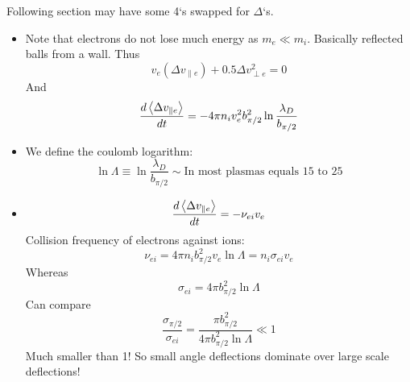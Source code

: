 Following section may have some 4`s swapped for $\Delta$`s. 
\begin{itemize}
\item Note that electrons do not lose much energy as $m_e \ll m_i$. Basically reflected balls from a wall. Thus
\[ v_e (\Delta v_{\parallel e}) + 0.5 \Delta v_{\perp e}^2 = 0\]
And
\[\frac{d \left< \Delta v_{\parallel e} \right>}{d t} = - 4 \pi n_i v_e^2 b_{\pi/2}^2 \ln{\frac{\lambda_D}{b_{\pi/2}}} \]
\item We define the coulomb logarithm: 
\[ \ln{\Lambda} \equiv \ln{\frac{\lambda_D}{b_{\pi/2}}} \sim \text{In most plasmas equals  15 to 25} \]
\item 
\[ \frac{d \left< \Delta v_{\parallel e}  \right>}{d t} = - \nu_{ei} v_e \]
Collision frequency of electrons against ions:
\[ \nu_{ei} = 4 \pi n_i b_{\pi/2}^2 v_e \ln{\Lambda} = n_i \sigma_{ei} v_e \]
Whereas
\[ \sigma_{ei} = 4 \pi b_{\pi/2}^2 \ln{\Lambda} \]
Can compare 
\[ \frac{\sigma_{\pi/2}}{\sigma_{ei}} = \frac{\pi b_{\pi/2}^2}{4 \pi b_{\pi/2}^2 \ln{\Lambda}} \ll 1\]
Much smaller than 1! So small angle deflections dominate over large scale deflections!
\end{itemize}

